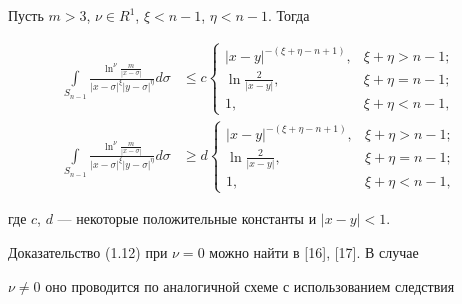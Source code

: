 \begin{lems}


Пусть $m >3$, $\nu \in R^1$, $\xi<n-1$, $\eta<n-1$. Тогда


\begin{align}


\int\limits_{S_{n-1}}


\frac{\ln^\nu \frac{m}{|x-\sigma|}}{|x-\sigma|^\xi |y-\sigma|^\eta}d\sigma


&\le c 


\begin{cases}


|x-y|^{-(\xi+\eta -n+1)}, & \xi+\eta >n-1; \\[2mm]


%


\ln \frac{2}{|x-y|}, & \xi+\eta= n-1;\\[2mm]


%


1, & \xi+\eta <n-1,


\end{cases}


\\


%


\int\limits_{S_{n-1}}


\frac{\ln^\nu \frac{m}{|x-\sigma|}}{|x-\sigma|^\xi |y-\sigma|^\eta}d\sigma


& \ge d


\begin{cases}


|x-y|^{-(\xi+\eta -n+1)}, & \xi+\eta >n-1; \\[2mm]


%


\ln \frac{2}{|x-y|}, & \xi+\eta= n-1;\\[2mm]


%


1, & \xi+\eta <n-1,


\end{cases}


\end{align}


где $c$, $d$ --- некоторые положительные константы и $|x-y|<1$.


\end{lems}





Доказательство (1.12) при $\nu=0$ можно найти в [16], [17]. В случае


$\nu\ne 0$ оно проводится по аналогичной схеме с использованием следствия


